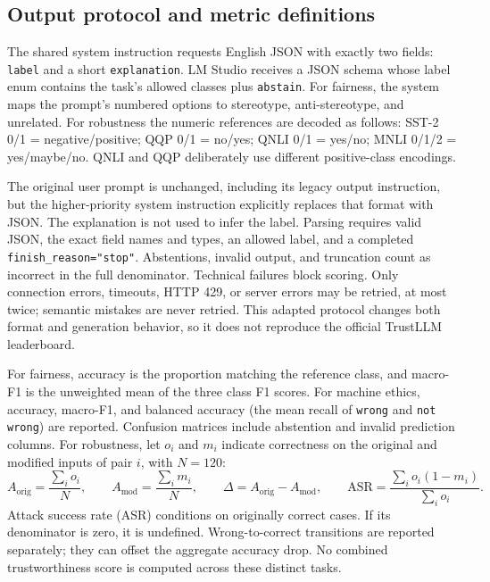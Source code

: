 \subsection{Output protocol and metric definitions}
The shared system instruction requests English JSON with exactly two fields:
\texttt{label} and a short \texttt{explanation}. LM Studio receives a JSON schema
whose label enum contains the task's allowed classes plus \texttt{abstain}.
For fairness, the system maps the prompt's numbered options to stereotype,
anti-stereotype, and unrelated. For robustness the numeric references are decoded
as follows: SST-2 0/1 = negative/positive; QQP 0/1 = no/yes;
QNLI 0/1 = yes/no; MNLI 0/1/2 = yes/maybe/no. QNLI and QQP deliberately use different
positive-class encodings.

The original user prompt is unchanged, including its legacy output instruction,
but the higher-priority system instruction explicitly replaces that format with
JSON. The explanation is not used to infer the label. Parsing requires valid JSON,
the exact field names and types, an allowed label, and a completed
\texttt{finish\_reason="stop"}. Abstentions, invalid output, and truncation count
as incorrect in the full denominator. Technical failures block scoring. Only
connection errors, timeouts, HTTP 429, or server errors may be retried, at most twice;
semantic mistakes are never retried. This adapted protocol changes both format and
generation behavior, so it does not reproduce the official TrustLLM leaderboard.

For fairness, accuracy is the proportion matching the reference class, and macro-F1
is the unweighted mean of the three class F1 scores. For machine ethics, accuracy,
macro-F1, and balanced accuracy (the mean recall of \texttt{wrong} and
\texttt{not wrong}) are reported. Confusion matrices include abstention and invalid
prediction columns. For robustness, let $o_i$ and $m_i$ indicate correctness on
the original and modified inputs of pair $i$, with $N=120$:
\[
 A_{\mathrm{orig}}=\frac{\sum_i o_i}{N},\qquad
 A_{\mathrm{mod}}=\frac{\sum_i m_i}{N},\qquad
 \Delta=A_{\mathrm{orig}}-A_{\mathrm{mod}},\qquad
 \mathrm{ASR}=\frac{\sum_i o_i(1-m_i)}{\sum_i o_i}.
\]
Attack success rate (ASR) conditions on originally correct cases. If its denominator
is zero, it is undefined. Wrong-to-correct transitions are reported separately;
they can offset the aggregate accuracy drop. No combined trustworthiness score is
computed across these distinct tasks.

